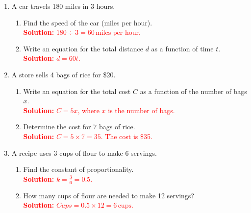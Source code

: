 \documentclass[10pt]{article}
\begin{document}
\begin{tcolorbox}[colframe=black!60, colback=white, 
coltitle=black, colbacktitle=black!15, fonttitle=\bfseries\Large, 
title=Problems, halign title=center, left=10pt, right=10pt, top=10pt, bottom=30pt]
\begin{enumerate}[start=9, itemsep=3em]
    \item A car travels 180 miles in 3 hours. 
    \begin{enumerate}[label=(\alph*)]
        \item Find the speed of the car (miles per hour).\\
        \textcolor{red}{\textbf{Solution:} \(180 \div 3 = 60 \, \text{miles per hour}\).}

        \item Write an equation for the total distance \(d\) as a function of time \(t\).\\
        \textcolor{red}{\textbf{Solution:} \(d = 60t\).}
    \end{enumerate}

    \item A store sells 4 bags of rice for \$20.  
    \begin{enumerate}[label=(\alph*)]
        \item Write an equation for the total cost \(C\) as a function of the number of bags \(x\).\\
        \textcolor{red}{\textbf{Solution:} \(C = 5x\), where \(x\) is the number of bags.}

        \item Determine the cost for 7 bags of rice.\\
        \textcolor{red}{\textbf{Solution:} \(C = 5 \times 7 = 35\). The cost is \$35.}
    \end{enumerate}

    \item A recipe uses 3 cups of flour to make 6 servings.  
    \begin{enumerate}[label=(\alph*)]
        \item Find the constant of proportionality.\\
        \textcolor{red}{\textbf{Solution:} \(k = \frac{3}{6} = 0.5\).}

        \item How many cups of flour are needed to make 12 servings?\\
        \textcolor{red}{\textbf{Solution:} \(Cups = 0.5 \times 12 = 6 \, \text{cups}\).}
    \end{enumerate}


\end{enumerate}
\end{tcolorbox}
\end{document}
